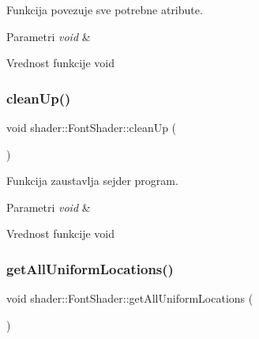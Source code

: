 Funkcija povezuje sve potrebne atribute. 


\begin{DoxyParams}{Parametri}
{\em void} & \\
\hline
\end{DoxyParams}
\begin{DoxyReturn}{Vrednost funkcije}
void 
\end{DoxyReturn}
\mbox{\label{classshader_1_1FontShader_a9df3b86fb4829d2505cf508b95a6238f}} 
\subsubsection{\texorpdfstring{clean\+Up()}{cleanUp()}}
{\footnotesize\ttfamily void shader\+::\+Font\+Shader\+::clean\+Up (\begin{DoxyParamCaption}\item[{void}]{ }\end{DoxyParamCaption})}



Funkcija zaustavlja sejder program. 


\begin{DoxyParams}{Parametri}
{\em void} & \\
\hline
\end{DoxyParams}
\begin{DoxyReturn}{Vrednost funkcije}
void 
\end{DoxyReturn}
\mbox{\label{classshader_1_1FontShader_a89c2e19fdbe971db4c7bdc72effd2043}} 
\subsubsection{\texorpdfstring{get\+All\+Uniform\+Locations()}{getAllUniformLocations()}}
{\footnotesize\ttfamily void shader\+::\+Font\+Shader\+::get\+All\+Uniform\+Locations (\begin{DoxyParamCaption}\item[{void}]{ }\end{DoxyParamCaption})}



